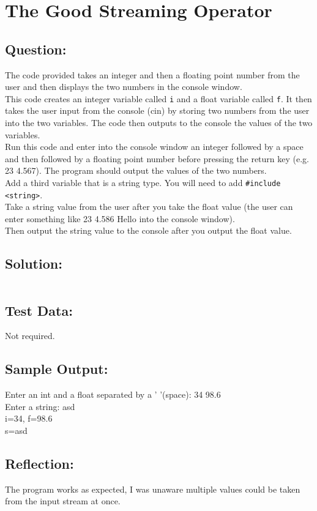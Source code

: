 \documentclass[Lab-B.tex]{subfiles}
\begin{document}
    \section{The Good Streaming Operator}
        \subsection*{Question:}
        The code provided takes an integer and then a floating point number from the user and then displays the two numbers in the console window. \\
        
        This code creates an integer variable called \texttt{i} and a float variable called \texttt{f}. 
        It then takes the user input from the console (cin) by storing two numbers from the user into the two variables. 
        The code then outputs to the console the values of the two variables. \\
        
        Run this code and enter into the console window an integer followed by a space and then followed by a floating point number before pressing the return key (e.g. 23  4.567). 
        The program should output the values of the two numbers.\\

        Add a third variable that is a string type. You will need to add \texttt{#include <string>}.\\

        Take a string value from the user after you take the float value (the user can enter something like 23  4.586  Hello into the console window).\\

        Then output the string value to the console after you output the float value.\\
            
        \subsection*{Solution:}
            \inputminted{cpp}{../Tasks/01-Good-Streaming/Good-Streaming.cpp}%

        \subsection*{Test Data:}
            Not required.
        
        \subsection*{Sample Output:}
            Enter an int and a float separated by a ' '(space): 34 98.6\\
            Enter a string: asd\\
            i=34, f=98.6\\
            s=asd\\      

        \subsection*{Reflection:}
            The program works as expected, I was unaware multiple values could be taken
            from the input stream at once.
\end{document}
